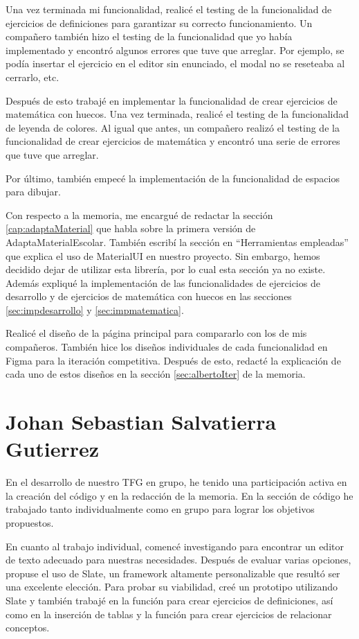 Una vez terminada mi funcionalidad, realicé el testing de la funcionalidad de ejercicios de definiciones para garantizar su correcto funcionamiento. Un compañero también hizo el testing de la funcionalidad que yo había implementado y encontró algunos errores que tuve que arreglar. Por ejemplo, se podía insertar el ejercicio en el editor sin enunciado, el modal no se reseteaba al cerrarlo, etc.

Después de esto trabajé en implementar la funcionalidad de crear ejercicios de matemática con huecos. Una vez terminada, realicé el testing de la funcionalidad de leyenda de colores. Al igual que antes, un compañero realizó el testing de la funcionalidad de crear ejercicios de matemática y encontró una serie de errores que tuve que arreglar.

Por último, también empecé la implementación de la funcionalidad de espacios para dibujar.

Con respecto a la memoria, me encargué de redactar la sección \ref{cap:adaptaMaterial} que habla sobre la primera versión de AdaptaMaterialEscolar. También escribí la sección en “Herramientas empleadas” que explica el uso de MaterialUI en nuestro proyecto. Sin embargo, hemos decidido dejar de utilizar esta librería, por lo cual esta sección ya no existe. Además expliqué la implementación de las funcionalidades de ejercicios de desarrollo y de ejercicios de matemática con huecos en las secciones \ref{sec:impdesarrollo} y \ref{sec:impmatematica}.

Realicé el diseño de la página principal para compararlo con los de mis compañeros. También hice los diseños individuales de cada funcionalidad en Figma para la iteración competitiva. Después de esto, redacté la explicación de cada uno de estos diseños en la sección \ref{sec:albertoIter} de la memoria.


\section{Johan Sebastian Salvatierra Gutierrez}
En el desarrollo de nuestro TFG en grupo, he tenido una participación activa en la creación del código y en la redacción de la memoria. En la sección de código he trabajado tanto individualmente como en grupo para lograr los objetivos propuestos.

En cuanto al trabajo individual, comencé investigando para encontrar un editor de texto adecuado para nuestras necesidades. Después de evaluar varias opciones, propuse el uso de Slate, un framework altamente personalizable que resultó ser una excelente elección. Para probar su viabilidad, creé un prototipo utilizando Slate y también trabajé en la función para crear ejercicios de definiciones, así como en la inserción de tablas y la función para crear ejercicios de relacionar conceptos.

